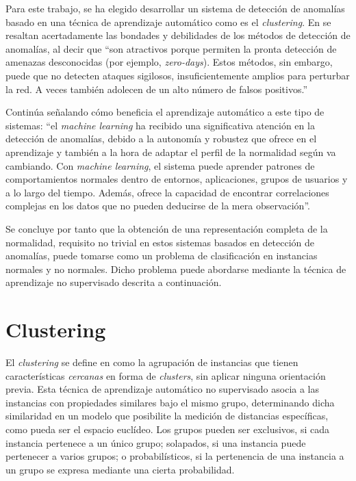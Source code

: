 Para este trabajo, se ha elegido desarrollar un sistema de detección de anomalías basado en una técnica de aprendizaje automático como es el \emph{clustering}.
En \cite{Alconzo_2019} se resaltan acertadamente las bondades y debilidades de los métodos de detección de anomalías, al decir que
``son atractivos porque permiten la pronta detección de amenazas desconocidas (por ejemplo, \emph{zero-days}).
Estos métodos, sin embargo, puede que no detecten ataques sigilosos, insuficientemente amplios para perturbar la red.
A veces también adolecen de un alto número de falsos positivos.''

Continúa señalando cómo beneficia el aprendizaje automático a este tipo de sistemas: ``el \emph{machine learning} ha recibido una significativa atención en la detección de anomalías, debido a
la autonomía y robustez que ofrece en el aprendizaje y también a la hora de adaptar el perfil de la normalidad según va cambiando.
Con \emph{machine learning}, el sistema puede aprender patrones de comportamientos normales dentro de entornos, aplicaciones, grupos de usuarios y a lo largo del tiempo.
Además, ofrece la capacidad de encontrar correlaciones complejas en los datos que no pueden deducirse de la mera observación''.

Se concluye por tanto que la obtención de una representación completa de la normalidad, requisito no trivial en estos sistemas basados en detección de anomalías,
puede tomarse como un problema de clasificación en instancias normales y no normales.
Dicho problema puede abordarse mediante la técnica de aprendizaje no supervisado descrita a continuación.

\section{Clustering}\label{clustering}

El \emph{clustering} se define en \cite{NA08} como la agrupación de instancias que tienen características \emph{cercanas} en forma de \emph{clusters}, sin aplicar ninguna orientación previa.
Esta técnica de aprendizaje automático no supervisado asocia a las instancias con propiedades similares bajo el mismo grupo,
determinando dicha similaridad en un modelo que posibilite la medición de distancias específicas, como pueda ser el espacio euclídeo.
Los grupos pueden ser exclusivos, si cada instancia pertenece a un único grupo;
solapados, si una instancia puede pertenecer a varios grupos;
o probabilísticos, si la pertenencia de una instancia a un grupo se expresa mediante una cierta probabilidad.

